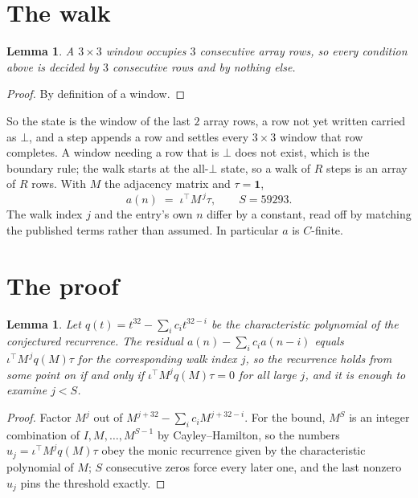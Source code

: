 \documentclass[11pt,a4paper]{article}
\theoremstyle{plain}
\newtheorem{lemma}[theorem]{Lemma}
\theoremstyle{definition}
\begin{document}
\section{The walk}

\begin{lemma}\label{lem:win}
A $3\times3$ window occupies $3$ consecutive array rows, so every condition above is
decided by $3$ consecutive rows and by nothing else.
\end{lemma}

\begin{proof}
By definition of a window.
\end{proof}

So the state is the window of the last $2$ array rows, a row not yet written carried as
$\bot$, and a step appends a row and settles every $3\times3$ window that row completes. A
window needing a row that is $\bot$ does not exist, which is the boundary rule; the walk starts
at the all-$\bot$ state, so a walk of $R$ steps is an array of $R$ rows. With $M$ the adjacency
matrix and $\tau=\mathbf{1}$,
\[
a(n)\;=\;\iota^{\!\top}M^{\,j}\tau ,\qquad S=59293.
\]
The walk index $j$ and the entry's own $n$ differ by a constant, read off by matching the
published terms rather than assumed. In particular $a$ is $C$-finite.

\section{The proof}

\begin{lemma}\label{lem:crit}
Let $q(t)=t^{32}-\sum_i c_it^{32-i}$ be the characteristic polynomial of the
conjectured recurrence. The residual $a(n)-\sum_ic_ia(n-i)$ equals
$\iota^{\!\top}M^{\,j}q(M)\tau$ for the corresponding walk index $j$, so the recurrence
holds from some point on if and only if $\iota^{\!\top}M^{j}q(M)\tau=0$ for all large $j$,
and it is enough to examine $j<S$.
\end{lemma}

\begin{proof}
Factor $M^{j}$ out of $M^{j+32}-\sum_ic_iM^{j+32-i}$. For the bound, $M^{S}$
is an integer combination of $I,M,\dots,M^{S-1}$ by Cayley--Hamilton, so the numbers
$u_j=\iota^{\!\top}M^{j}q(M)\tau$ obey the monic recurrence given by the characteristic
polynomial of $M$; $S$ consecutive zeros force every later one, and the last nonzero $u_j$
pins the threshold exactly.
\end{proof}
\end{document}
